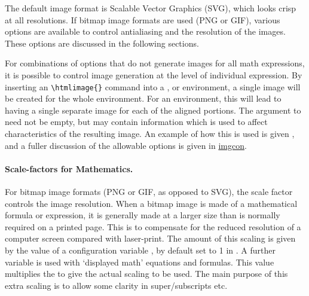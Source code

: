 The default image format is Scalable Vector Graphics (SVG),
which looks crisp at all resolutions.  If bitmap image
formats are used (PNG or GIF), various options are
available to control antialiasing and the resolution
of the images.  These options are discussed in the
following sections.


For combinations of options that do not generate images for all
math expressions, it is possible to control image generation
at the level of individual expression.
By inserting an \verb|\htmlimage{}| command into a ,
 or  environment, a single image
will be created for the whole environment. For an 
environment, this will lead to having a single separate image 
for each of the aligned portions. 
The argument to  need not be empty, but may contain
information which is used to affect characteristics of the resulting
image. An example of how this is used is given ,
and a fuller discussion of the allowable options is given in
\hyperref{the next section}{Section~}{}{imgcon}.


%
\paragraph*{Scale-factors for Mathematics.\label{mathscales}}
%
For bitmap image formats (PNG or GIF, as opposed to SVG),
the scale factor controls the image resolution.
When a bitmap image 
is made of a mathematical formula or expression,
it is generally made at a larger size 
than is normally required on a printed page.
This is to compensate for the reduced resolution of a computer screen
compared with laser-print.  
The amount of this scaling is given by the
value of a configuration variable ,
by default set to 1 in . 
A further variable  is used with
`displayed math' equations and formulas.
This value multiplies the  
to give the actual scaling to be used.
The main purpose of this extra scaling is to allow some clarity in
super/subscripts etc.


%
